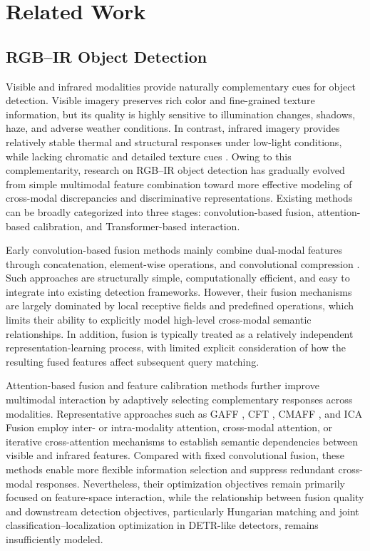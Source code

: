 \documentclass[letterpaper,journal]{IEEEtran}
\begin{document}
\section{Related Work}
\subsection{RGB--IR Object Detection}

Visible and infrared modalities provide naturally complementary cues for object detection. Visible imagery preserves rich color and fine-grained texture information, but its quality is highly sensitive to illumination changes, shadows, haze, and adverse weather conditions. In contrast, infrared imagery provides relatively stable thermal and structural responses under low-light conditions, while lacking chromatic and detailed texture cues \cite{kaist,cft,cmaff,rgbt_fusion}. Owing to this complementarity, research on RGB--IR object detection has gradually evolved from simple multimodal feature combination toward more effective modeling of cross-modal discrepancies and discriminative representations. Existing methods can be broadly categorized into three stages: convolution-based fusion, attention-based calibration, and Transformer-based interaction.

Early convolution-based fusion methods mainly combine dual-modal features through concatenation, element-wise operations, and convolutional compression \cite{halfway}. Such approaches are structurally simple, computationally efficient, and easy to integrate into existing detection frameworks. However, their fusion mechanisms are largely dominated by local receptive fields and predefined operations, which limits their ability to explicitly model high-level cross-modal semantic relationships. In addition, fusion is typically treated as a relatively independent representation-learning process, with limited explicit consideration of how the resulting fused features affect subsequent query matching.

Attention-based fusion and feature calibration methods further improve multimodal interaction by adaptively selecting complementary responses across modalities. Representative approaches such as GAFF \cite{gaff}, CFT \cite{cft}, CMAFF \cite{cmaff}, and ICA Fusion \cite{icafusion} employ inter- or intra-modality attention, cross-modal attention, or iterative cross-attention mechanisms to establish semantic dependencies between visible and infrared features. Compared with fixed convolutional fusion, these methods enable more flexible information selection and suppress redundant cross-modal responses. Nevertheless, their optimization objectives remain primarily focused on feature-space interaction, while the relationship between fusion quality and downstream detection objectives, particularly Hungarian matching and joint classification--localization optimization in DETR-like detectors, remains insufficiently modeled.
\end{document}
